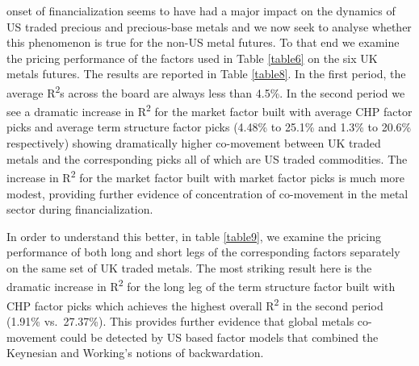 \documentclass[12pt,]{article}
\begin{document}
onset of financialization seems to have had a major impact on the
dynamics of US traded precious and precious-base metals and we now seek
to analyse whether this phenomenon is true for the non-US metal futures.
To that end we examine the pricing performance of the factors used in
Table \ref{table6} on the six UK metals futures. The results are
reported in Table \ref{table8}. In the first period, the average
R\textsuperscript{2}s across the board are always less than 4.5\%. In
the second period we see a dramatic increase in R\textsuperscript{2} for
the market factor built with average CHP factor picks and average term
structure factor picks (4.48\% to 25.1\% and 1.3\% to 20.6\%
respectively) showing dramatically higher co-movement between UK traded
metals and the corresponding picks all of which are US traded
commodities. The increase in R\textsuperscript{2} for the market factor
built with market factor picks is much more modest, providing further
evidence of concentration of co-movement in the metal sector during
financialization.

In order to understand this better, in table \ref{table9}, we examine
the pricing performance of both long and short legs of the corresponding
factors separately on the same set of UK traded metals. The most
striking result here is the dramatic increase in R\textsuperscript{2}
for the long leg of the term structure factor built with CHP factor
picks which achieves the highest overall R\textsuperscript{2} in the
second period (1.91\% vs.~27.37\%). This provides further evidence that
global metals co-movement could be detected by US based factor models
that combined the Keynesian and Working's notions of backwardation.
\end{document}
